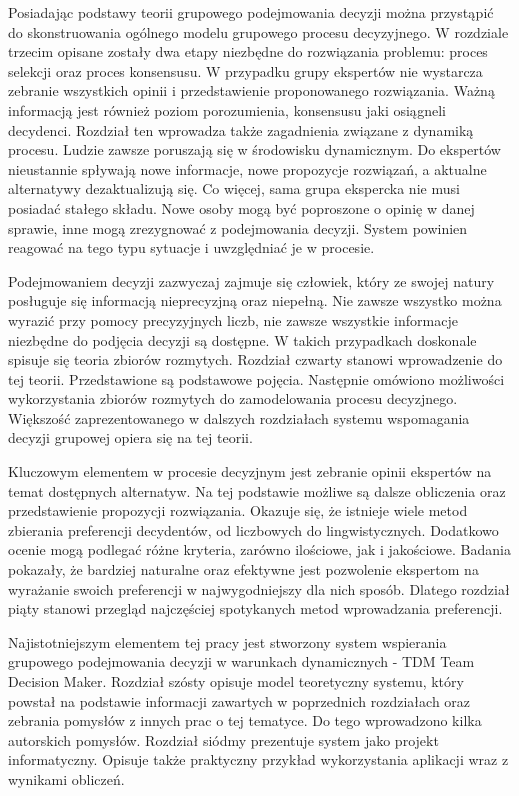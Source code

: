 Posiadając podstawy teorii grupowego podejmowania decyzji można przystąpić do
skonstruowania ogólnego modelu grupowego procesu decyzyjnego. W rozdziale
trzecim opisane zostały dwa etapy niezbędne do rozwiązania problemu: proces
selekcji oraz proces konsensusu. W przypadku grupy ekspertów nie wystarcza
zebranie wszystkich opinii i przedstawienie proponowanego rozwiązania. Ważną
informacją jest również poziom porozumienia, konsensusu jaki osiągneli
decydenci. Rozdział ten wprowadza także zagadnienia związane z dynamiką procesu.
Ludzie zawsze poruszają się w środowisku dynamicznym. Do ekspertów nieustannie
spływają nowe informacje, nowe propozycje rozwiązań, a aktualne alternatywy
dezaktualizują się. Co więcej, sama grupa ekspercka nie musi posiadać stałego
składu. Nowe osoby mogą być poproszone o opinię w danej sprawie, inne mogą
zrezygnować z podejmowania decyzji. System powinien reagować na tego typu
sytuacje i uwzględniać je w procesie.

Podejmowaniem decyzji zazwyczaj zajmuje się człowiek, który ze swojej natury
posługuje się informacją nieprecyzjną oraz niepełną. Nie zawsze wszystko można
wyrazić przy pomocy precyzyjnych liczb, nie zawsze wszystkie informacje
niezbędne do podjęcia decyzji są dostępne. W takich przypadkach doskonale
spisuje się teoria zbiorów rozmytych. Rozdział czwarty stanowi wprowadzenie do
tej teorii. Przedstawione są podstawowe pojęcia. Następnie omówiono możliwości
wykorzystania zbiorów rozmytych do zamodelowania procesu decyzjnego. Większość
zaprezentowanego w dalszych rozdziałach systemu wspomagania decyzji grupowej
opiera się na tej teorii.

Kluczowym elementem w procesie decyzjnym jest zebranie opinii ekspertów na temat
dostępnych alternatyw. Na tej podstawie możliwe są dalsze obliczenia
oraz przedstawienie propozycji rozwiązania. Okazuje się, że istnieje wiele metod
zbierania preferencji decydentów, od liczbowych do lingwistycznych. Dodatkowo
ocenie mogą podlegać różne kryteria, zarówno ilościowe, jak i jakościowe.
Badania pokazały, że bardziej naturalne oraz efektywne jest pozwolenie
ekspertom na wyrażanie swoich preferencji w najwygodniejszy dla nich sposób.
Dlatego rozdział piąty stanowi przegląd najczęściej spotykanych metod
wprowadzania preferencji.

Najistotniejszym elementem tej pracy jest stworzony system wspierania grupowego
podejmowania decyzji w warunkach dynamicznych - TDM Team Decision Maker.
Rozdział szósty opisuje model teoretyczny systemu, który powstał na podstawie
informacji zawartych w poprzednich rozdziałach oraz zebrania pomysłów z innych
prac o tej tematyce. Do tego wprowadzono kilka autorskich pomysłów. Rozdział
siódmy prezentuje system jako projekt informatyczny. Opisuje także praktyczny
przykład wykorzystania aplikacji wraz z wynikami obliczeń.
















